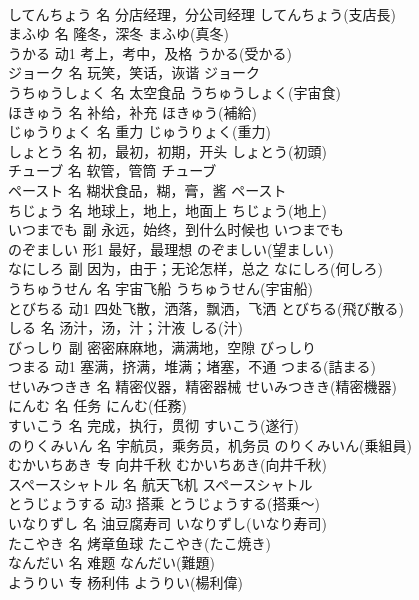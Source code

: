 \documentclass[8pt]{extreport}
\begin{document}
\begin{CJK}{UTF8}{min}
\\	してんちょう	名	分店经理，分公司经理	してんちょう(支店長)	
\\	まふゆ	名	隆冬，深冬	まふゆ(真冬)	
\\	うかる	动1	考上，考中，及格	うかる(受かる)	
\\	ジョーク	名	玩笑，笑话，诙谐	ジョーク	
\\	うちゅうしょく	名	太空食品	うちゅうしょく(宇宙食)	
\\	ほきゅう	名	补给，补充	ほきゅう(補給)	
\\	じゅうりょく	名	重力	じゅうりょく(重力)	
\\	しょとう	名	初，最初，初期，开头	しょとう(初頭)	
\\	チューブ	名	软管，管筒	チューブ	
\\	ペースト	名	糊状食品，糊，膏，酱	ペースト	
\\	ちじょう	名	地球上，地上，地面上	ちじょう(地上)	
\\	いつまでも	副	永远，始终，到什么时候也	いつまでも	
\\	のぞましい	形1	最好，最理想	のぞましい(望ましい)	
\\	なにしろ	副	因为，由于；无论怎样，总之	なにしろ(何しろ)	
\\	うちゅうせん	名	宇宙飞船	うちゅうせん(宇宙船)	
\\	とびちる	动1	四处飞散，洒落，飘洒，飞洒	とびちる(飛び散る)	
\\	しる	名	汤汁，汤，汁；汁液	しる(汁)	
\\	びっしり	副	密密麻麻地，满满地，空隙	びっしり	
\\	つまる	动1	塞满，挤满，堆满；堵塞，不通	つまる(詰まる)	
\\	せいみつきき	名	精密仪器，精密器械	せいみつきき(精密機器)	
\\	にんむ	名	任务	にんむ(任務)	
\\	すいこう	名	完成，执行，贯彻	すいこう(遂行)	
\\	のりくみいん	名	宇航员，乘务员，机务员	のりくみいん(乗組員)	
\\	むかいちあき	专	向井千秋	むかいちあき(向井千秋)	
\\	スペースシャトル	名	航天飞机	スペースシャトル	
\\	とうじょうする	动3	搭乘	とうじょうする(搭乗～)	
\\	いなりずし	名	油豆腐寿司	いなりずし(いなり寿司)	
\\	たこやき	名	烤章鱼球	たこやき(たこ焼き)	
\\	なんだい	名	难题	なんだい(難題)	
\\	ようりい	专	杨利伟	ようりい(楊利偉)	

\end{CJK}
\end{document}
